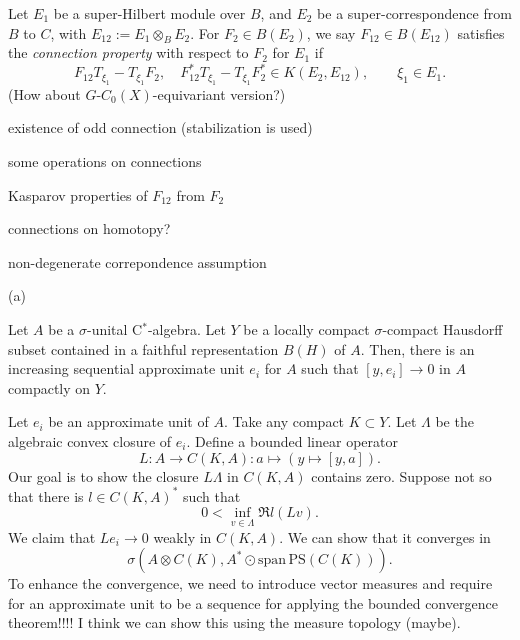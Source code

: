 \documentclass{../../large}
\begin{document}
\begin{prb}[Connections]
Let $E_1$ be a super-Hilbert module over $B$, and $E_2$ be a super-correspondence from $B$ to $C$, with $E_{12}:=E_1\otimes_B E_2$.
For $F_2\in B(E_2)$, we say $F_{12}\in B(E_{12})$ satisfies the \emph{connection property} with respect to $F_2$ for $E_1$ if
\[F_{12}T_{\xi_1}-T_{\xi_1}F_2,\quad F_{12}^*T_{\xi_1}-T_{\xi_1}F_2^*\in K(E_2,E_{12}),\qquad\xi_1\in E_1.\]
(How about $G$-$C_0(X)$-equivariant version?)
\begin{parts}
\item existence of odd connection (stabilization is used)
\item some operations on connections
\item Kasparov properties of $F_{12}$ from $F_2$
\item connections on homotopy?
\item non-degenerate correpondence assumption
\end{parts}
\end{prb}
\begin{pf}
(a)



\end{pf}

\begin{prb}
Let $A$ be a $\sigma$-unital C$^*$-algebra.
Let $Y$ be a locally compact $\sigma$-compact Hausdorff subset contained in a faithful representation $B(H)$ of $A$.
Then, there is an increasing sequential approximate unit $e_i$ for $A$ such that $[y,e_i]\to0$ in $A$ compactly on $Y$.
\end{prb}
\begin{pf}
Let $e_i$ be an approximate unit of $A$.
Take any compact $K\subset Y$.
Let $\Lambda$ be the algebraic convex closure of $e_i$.
Define a bounded linear operator
\[L:A\to C(K,A):a\mapsto(y\mapsto[y,a]).\]
Our goal is to show the closure $L\Lambda$ in $C(K,A)$ contains zero.
Suppose not so that there is $l\in C(K,A)^*$ such that
\[0<\inf_{v\in\Lambda}\Re l(Lv).\]
We claim that $Le_i\to0$ weakly in $C(K,A)$.
We can show that it converges in
\[\sigma(A\otimes C(K),A^*\odot\mathrm{span}\,\mathrm{PS}(C(K))).\]
To enhance the convergence, we need to introduce vector measures and require for an approximate unit to be a sequence for applying the bounded convergence theorem!!!!
I think we can show this using the measure topology (maybe).
\end{pf}
\end{document}
